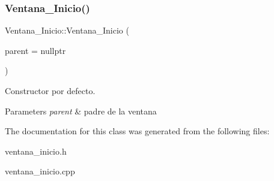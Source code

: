 \subsubsection{\texorpdfstring{Ventana\+\_\+\+Inicio()}{Ventana\_Inicio()}}
{\footnotesize\ttfamily Ventana\+\_\+\+Inicio\+::\+Ventana\+\_\+\+Inicio (\begin{DoxyParamCaption}\item[{Q\+Widget $\ast$}]{parent = {\ttfamily nullptr} }\end{DoxyParamCaption})\hspace{0.3cm}{\ttfamily [explicit]}}



Constructor por defecto. 


\begin{DoxyParams}{Parameters}
{\em parent} & padre de la ventana \\
\hline
\end{DoxyParams}


The documentation for this class was generated from the following files\+:\begin{DoxyCompactItemize}
\item 
ventana\+\_\+inicio.\+h\item 
ventana\+\_\+inicio.\+cpp\end{DoxyCompactItemize}

